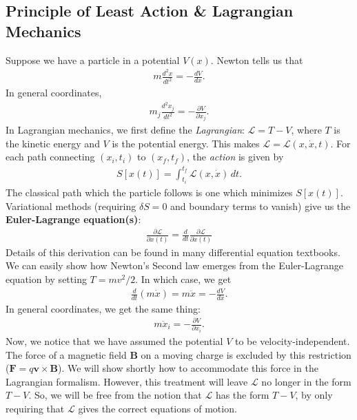 \documentclass{book}
\theoremstyle{definition}
\newcommand{\p}{\partial}
\newcommand{\lag}{\mathcal{L}}
\newcommand{\f}[2]{\frac{#1}{#2}}
\begin{document}
\subsection{Principle of Least Action \& Lagrangian Mechanics}

Suppose we have a particle in a potential $V(x)$. Newton tells us that
\begin{align}
m\f{d^2 x}{dt^2} = -\f{dV}{dx}.
\end{align}
In general coordinates,
\begin{align}
m_j \f{d^2x_j}{dt^2} = -\f{\p V}{\p x_j}.
\end{align}
In Lagrangian mechanics, we first define the \textit{Lagrangian}: $\lag = T - V$, where $T$ is the kinetic energy and $V$ is the potential energy. This makes $\lag = \lag(x,\dot{x},t)$. For each path connecting $(x_i,t_i)$ to $(x_f,t_f)$, the \textit{action} is given by
\begin{align}
S[x(t)] = \int^{t_f}_{t_i} \lag(x,\dot{x})\,dt.
\end{align}
The classical path which the particle follows is one which minimizes $S[x(t)]$. Variational methods (requiring $\delta S = 0$ and boundary terms to vanish) give us the \textbf{Euler-Lagrange equation(s)}:
\begin{align}
\boxed{\f{\p \lag}{\p x(t)} = \f{d}{dt}\f{\p \lag}{\p \dot{x}(t)}}
\end{align}
Details of this derivation can be found in many differential equation textbooks. We can easily show how Newton's Second law emerges from the Euler-Lagrange equation by setting $T = mv^2/2$. In which case, we get
\begin{align}
\f{d}{dt}(m\dot{x}) = m\ddot{x}= -\f{dV}{dx}.
\end{align}  
In general coordinates, we get the same thing:
\begin{align}
m\ddot{x}_{i} = -\f{\p V}{\p x_i}.
\end{align}
Now, we notice that we have assumed the potential $V$ to be velocity-independent. The force of a magnetic field $\mathbf{B}$ on a moving charge is excluded by this restriction ($\mathbf{F} = q\mathbf{v}\times \mathbf{B}$). We will show shortly how to accommodate this force in the Lagrangian formalism. However, this treatment will leave $\lag$ no longer in the form $T - V$. So, we will be free from the notion that $\lag$ has the form $T-V$, by only requiring that $\lag$ gives the correct equations of motion.
\end{document}
